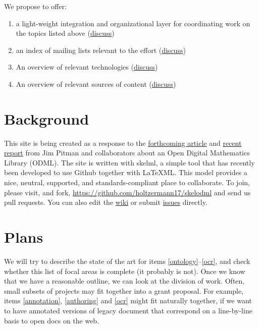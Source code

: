\documentclass{article}
\begin{document}
We propose to offer:

\begin{enumerate}
\item\label{integration} a light-weight integration and organizational layer for coordinating work on the topics listed above (\href{https://github.com/holtzermann17/skelodml/wiki/1.-Home}{discuss})
\item\label{mail} an index of mailing lists relevant to the effort (\href{https://github.com/holtzermann17/skelodml/wiki/2.-Mailing-lists}{discuss})
\item\label{technology} An overview of relevant technologies (\href{https://github.com/holtzermann17/skelodml/wiki/3.-Technology-overview}{discuss})
\item\label{content} An overview of relevant sources of content (\href{https://github.com/holtzermann17/skelodml/wiki/4.-Content-overview}{discuss})
\end{enumerate}

\section{Background}

This site is being created as a response to the  \href{http://www.mathunion.org/fileadmin/CEIC/planning_wdml.pdf}{forthcoming article} and
 \href{http://arxiv.org/abs/1404.1905}{recent report} from Jim Pitman and collaborators about an Open Digital Mathematics Library (ODML).
%
The site is written with skelml, a simple tool that has recently been developed to use Github together with \LaTeX ML.  This model provides a nice, neutral, supported, and standards-compliant place to collaborate.  To join, please visit, and fork, \url{https://github.com/holtzermann17/skelodml} and send us pull requests.  You can also edit the \href{https://github.com/holtzermann17/skelodml/wiki}{wiki} or
submit \href{https://github.com/holtzermann17/skelodml/issues}{issues} directly.

\section{Plans}

We will try to describe the state of the art for items \ref{ontology}--\ref{ocr}, and check whether this list of focal areas is complete (it probably is not).  Once we know that we have a reasonable outline, we can look at the division of work.  Often, small subsets of projects may fit together into a grant proposal.  For example, items \ref{annotation}, \ref{authoring} and \ref{ocr} might fit naturally together, if we want to have annotated versions of legacy document that correspond on a line-by-line basis to open docs on the web.
\end{document}
